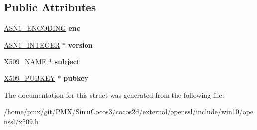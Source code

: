\subsection*{Public Attributes}
\begin{DoxyCompactItemize}
\item 
\mbox{\label{structX509__req__info__st_a7db85d33e14e55ab747c4c28ed259ba5}} 
\hyperlink{structASN1__ENCODING__st}{A\+S\+N1\+\_\+\+E\+N\+C\+O\+D\+I\+NG} {\bfseries enc}
\item 
\mbox{\label{structX509__req__info__st_a3f5f148e75b34d4cdce959b0a744d7db}} 
\hyperlink{structasn1__string__st}{A\+S\+N1\+\_\+\+I\+N\+T\+E\+G\+ER} $\ast$ {\bfseries version}
\item 
\mbox{\label{structX509__req__info__st_a58cdac102c16aadc3617e2f430b966c2}} 
\hyperlink{structX509__name__st}{X509\+\_\+\+N\+A\+ME} $\ast$ {\bfseries subject}
\item 
\mbox{\label{structX509__req__info__st_a6aa13ec7edfacffb598f1c024c28ad46}} 
\hyperlink{structX509__pubkey__st}{X509\+\_\+\+P\+U\+B\+K\+EY} $\ast$ {\bfseries pubkey}
\end{DoxyCompactItemize}


The documentation for this struct was generated from the following file\+:\begin{DoxyCompactItemize}
\item 
/home/pmx/git/\+P\+M\+X/\+Simu\+Cocos3/cocos2d/external/openssl/include/win10/openssl/x509.\+h\end{DoxyCompactItemize}
